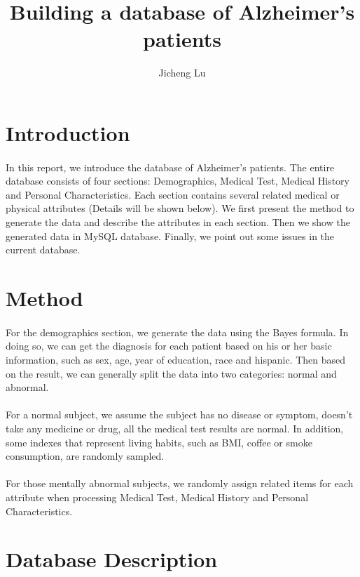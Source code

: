 \documentclass{article}
\title{Building a database of Alzheimer's patients}
\author{Jicheng Lu}
\date{}
\begin{document}
\maketitle

\section{Introduction}
\paragraph{}
In this report, we introduce the database of Alzheimer's patients. The entire database consists of four sections: Demographics, Medical Test, Medical History and Personal Characteristics. Each section contains several related medical or physical attributes (Details will be shown below). We first present the method to generate the data and describe the attributes in each section. Then we show the generated data in MySQL database. Finally, we point out some issues in the current database. \\

\section{Method}
\paragraph{}
For the demographics section, we generate the data using the Bayes formula. In doing so, we can get the diagnosis for each patient based on his or her basic information, such as sex, age, year of education, race and hispanic. Then based on the result, we can generally split the data into two categories: normal and abnormal. \\
\\
For a normal subject, we assume the subject has no disease or symptom, doesn't take any medicine or drug, all the medical test results are normal. In addition, some indexes that represent living habits, such as BMI, coffee or smoke consumption, are randomly sampled. \\
\\
For those mentally abnormal subjects, we randomly assign related items for each attribute when processing Medical Test, Medical History and Personal Characteristics.


\section{Database Description}
\end{document}
